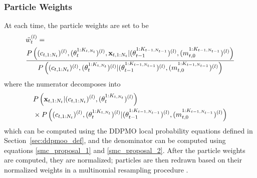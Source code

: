 \documentclass{article}
\begin{document}
\subsubsection{Particle Weights}
At each time, the particle weights are set to be
\small
\begin{equation}
    \begin{split}
        &\tilde{w}_{t}^{(l)} = \\
            &\frac{ P\left( (c_{t,1:N_t})^{(l)}, (\theta_t^{1:K_{t,N_t}})^{(l)}, \mathbf{x}_{t,1:N_t} | 
                  (\theta_{t-1}^{1:K_{t-1,N_{t-1}}})^{(l)}, (m_{t,0}^{1:K_{t-1,N_{t-1}}})^{(l)}\right) }
                { P\left((c_{t,1:N_t})^{(l)}, (\theta_t^{1:K_{t,N_t}})^{(l)} | 
                  (\theta_{t-1}^{1:K_{t-1,N_{t-1}}})^{(l)}, (m_{t,0}^{1:K_{t-1,N_{t-1}}})^{(l)}\right) }\\
    \end{split}
    \raisetag{60pt}
\end{equation}
\normalsize
where the numerator decomposes into
\small
\begin{equation}
    \begin{split}
        &P\left(\mathbf{x}_{t,1:N_t} | (c_{t,1:N_t})^{(l)}, (\theta_t^{1:K_{t,N_t}})^{(l)} \right)\\
        &\times P\left((c_{t,1:N_t})^{(l)}, (\theta_t^{1:K_{t,N_t}})^{(l)} | 
            (\theta_{t-1}^{1:K_{t-1,N_{t-1}}})^{(l)}, (m_{t,0}^{1:K_{t-1,N_{t-1}}})^{(l)}\right)
    \end{split}
    \raisetag{40pt}
\end{equation}
\normalsize
which can be computed using the DDPMO local probability equations defined in Section~\ref{sec:ddpmoo_def}, and the denominator can be computed using equations \ref{smc_proposal_1} and \ref{smc_proposal_2}.
After the particle weights are computed, they are normalized; particles are then redrawn based on their normalized weights in a multinomial resampling procedure \cite{douc2005comparison}.
\end{document}
